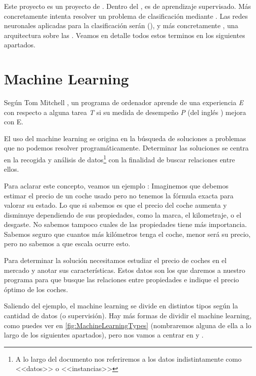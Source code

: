 

Este proyecto es un proyecto de . Dentro del , es de aprendizaje supervisado. Más concretamente intenta resolver un problema de clasificación mediante . Las redes neuronales aplicadas para la clasificación serán  (), y más concretamente , una arquitectura sobre las . Veamos en detalle todos estos terminos en los siguientes apartados.

\section{Machine Learning}

Según Tom Mitchell , un programa de ordenador aprende de una experiencia \textit{E} con respecto a alguna tarea \textit{T} si su medida de desempeño \textit{P} (del inglés ) mejora con E.

El uso del machine learning se origina en la búsqueda de soluciones a problemas que no podemos resolver programáticamente. Determinar las soluciones se centra en la recogida y análisis de datos\footnote{A lo largo del documento nos referiremos a los datos indistintamente como <<datos>> o <<instancias>>} con la finalidad de buscar relaciones entre ellos.

Para aclarar este concepto, veamos un ejemplo \label{example:car_price}:
Imaginemos que debemos estimar el precio de un coche usado pero no tenemos la fórmula exacta para valorar su estado. Lo que si sabemos es que el precio del coche aumenta y disminuye dependiendo de sus propiedades, como la marca, el kilometraje, o el desgaste. No sabemos tampoco cuales de las propiedades tiene más importancia. Sabemos seguro que cuantos más kilómetros tenga el coche, menor será su precio, pero no sabemos a que escala ocurre esto.

Para determinar la solución necesitamos estudiar el precio de coches en el mercado y anotar sus características. Estos datos son los que daremos a nuestro programa para que busque las relaciones entre propiedades e indique el precio óptimo de los coches.

Saliendo del ejemplo, el machine learning se divide en distintos tipos según la cantidad de datos (o supervisión). Hay más formas de dividir el machine learning, como puedes ver en \ref{fig:MachineLearningTypes} (nombraremos alguna de ella a lo largo de los siguientes apartados), pero nos vamos a centrar en  y .

